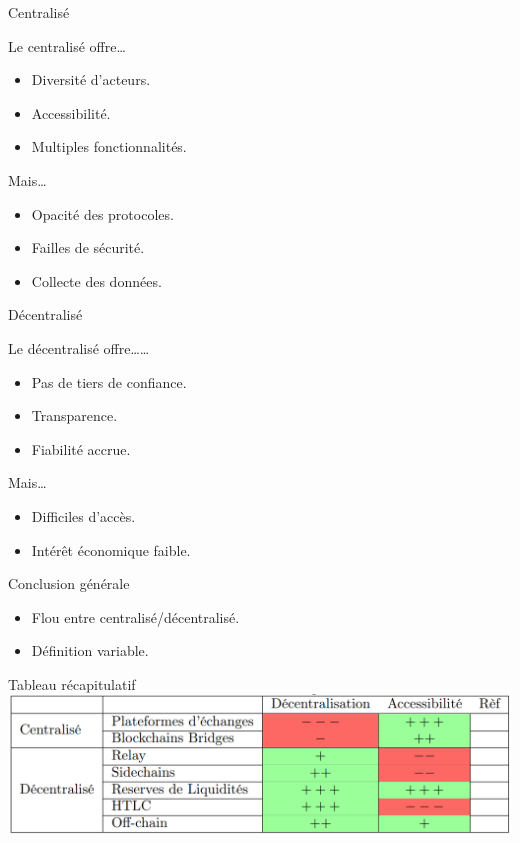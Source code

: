 \begin{frame}{Centralisé}
    \begin{block}{Le centralisé offre\dots}
        \begin{itemize}
            \item Diversité d'acteurs.
            \item Accessibilité.
            \item Multiples fonctionnalités.
        \end{itemize}
    \end{block}
    \begin{block}{Mais\dots}
        \begin{itemize}
            \item Opacité des protocoles.
            \item Failles de sécurité.
            \item Collecte des données.
        \end{itemize}
    \end{block}
\end{frame}


\begin{frame}{Décentralisé}
    \begin{block}{Le décentralisé offre\dots\dots}
        \begin{itemize}
            \item Pas de tiers de confiance.
            \item Transparence.
            \item Fiabilité accrue.
        \end{itemize}
    \end{block}
    \begin{block}{Mais\dots}
        \begin{itemize}
            \item Difficiles d'accès.
            \item Intérêt économique faible.
        \end{itemize}
    \end{block}
\end{frame}

\begin{frame}{Conclusion générale}
    \begin{itemize}
        \item Flou entre centralisé/décentralisé.
        \item Définition variable.
    \end{itemize}
\end{frame}

\begin{frame}{Tableau récapitulatif}
    \centering
    \includegraphics[scale = 0.2]{conclusion/tableau.png}
\end{frame}